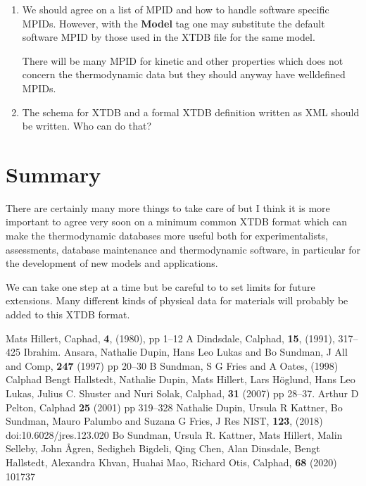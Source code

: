 \documentclass{article}
\begin{document}
\begin{enumerate}
\item We should agree on a list of MPID and how to handle software
  specific MPIDs.  However, with the {\bf Model} tag one may
  substitute the default software MPID by those used in the XTDB file
  for the same model.

  There will be many MPID for kinetic and other properties which does
  not concern the thermodynamic data but they should anyway have
  welldefined MPIDs.

\item The schema for XTDB and a formal XTDB definition written as XML
  should be written.  Who can do that?
  
\end{enumerate}

\section{Summary}

There are certainly many more things to take care of but I think it is
more important to agree very soon on a minimum common XTDB format
which can make the thermodynamic databases more useful both for
experimentalists, assessments, database maintenance and thermodynamic
software, in particular for the development of new models and
applications.

We can take one step at a time but be careful to to set limits for
future extensions.  Many different kinds of physical data for
materials will probably be added to this XTDB format.

\begin{thebibliography}{00Zzzz}
 Mats Hillert,  Caphad, {\bf 4}, (1980), pp 1--12
 A Dindsdale, Calphad, {\bf 15}, (1991), 317--425
 Ibrahim. Ansara, Nathalie Dupin, Hans Leo Lukas and Bo Sundman,
  J All and Comp, {\bf 247} (1997) pp 20--30
 B Sundman, S G Fries and A Oates, (1998) Calphad
 Bengt Hallstedt, Nathalie Dupin, Mats Hillert, Lars
  H{\"o}glund, Hans Leo Lukas, Julius C. Shuster and Nuri Solak,
  Calphad, {\bf 31} (2007) pp 28--37.
 Arthur D Pelton, Calphad {\bf 25} (2001) pp 319--328
 Nathalie Dupin, Ursula R Kattner, Bo Sundman, Mauro
  Palumbo and Suzana G Fries, J Res NIST, {\bf 123}, (2018)
  doi:10.6028/jres.123.020
 Bo Sundman, Ursula R. Kattner, Mats Hillert, Malin
  Selleby, John Ågren, Sedigheh Bigdeli, Qing Chen, Alan Dinsdale,
  Bengt Hallstedt, Alexandra Khvan, Huahai Mao, Richard Otis, Calphad,
  {\bf 68} (2020) 101737
\end{thebibliography}
\end{document}
